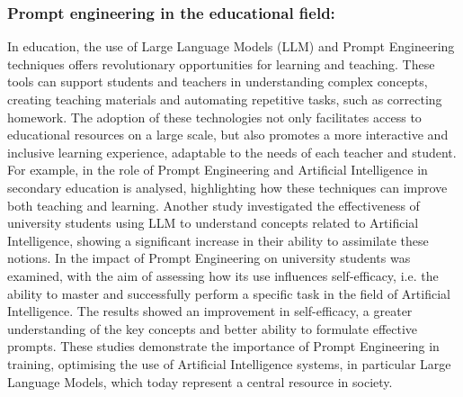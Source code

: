 \subsubsection{Prompt engineering in the educational field:}
In education, the use of Large Language Models (LLM) and Prompt Engineering techniques offers revolutionary opportunities for learning and teaching. These tools can support students and teachers in understanding complex concepts, creating teaching materials and automating repetitive tasks, such as correcting homework. The adoption of these technologies not only facilitates access to educational resources on a large scale, but also promotes a more interactive and inclusive learning experience, adaptable to the needs of each teacher and student.
For example, in \cite{lee2025prompt} the role of Prompt Engineering and Artificial Intelligence in secondary education is analysed, highlighting how these techniques can improve both teaching and learning.
Another study \cite{woo2024effectspromptengineeringintervention}investigated the effectiveness of university students using LLM to understand concepts related to Artificial Intelligence, showing a significant increase in their ability to assimilate these notions.
In \cite{baldassarre2024didattica} the impact of Prompt Engineering on university students was examined, with the aim of assessing how its use influences self-efficacy, i.e. the ability to master and successfully perform a specific task in the field of Artificial Intelligence. The results showed an improvement in self-efficacy, a greater understanding of the key concepts and better ability to formulate effective prompts.
These studies demonstrate the importance of Prompt Engineering in training, optimising the use of Artificial Intelligence systems, in particular Large Language Models, which today represent a central resource in society.

